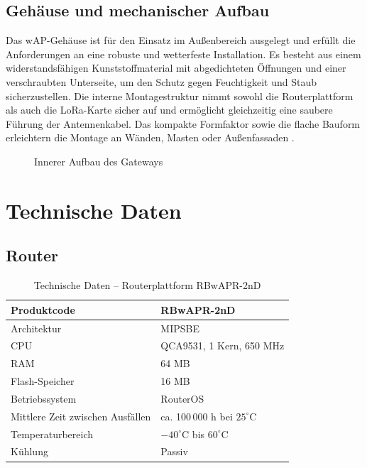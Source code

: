 	\subsection{Gehäuse und mechanischer Aufbau}
		Das wAP-Gehäuse ist für den Einsatz im Au{\ss}enbereich ausgelegt und erfüllt die Anforderungen an eine robuste und wetterfeste Installation. Es besteht aus einem widerstandsfähigen Kunststoffmaterial mit abgedichteten Öffnungen und einer verschraubten Unterseite, um den Schutz gegen Feuchtigkeit und Staub sicherzustellen. Die interne Montagestruktur nimmt sowohl die Routerplattform als auch die LoRa-Karte sicher auf und ermöglicht gleichzeitig eine saubere Führung der Antennenkabel. Das kompakte Formfaktor sowie die flache Bauform erleichtern die Montage an Wänden, Masten oder Au{\ss}enfassaden \cite{mikrotik:2020}.
		
		\begin{figure}[H]
			\centering
			\caption{Innerer Aufbau des Gateways}
		\end{figure}


\section{Technische Daten}
	\subsection{Router}
		\begin{table}[H]
			\centering
			\begin{tabular}{| l | l |}
				\hline
				Produktcode & RBwAPR-2nD \\
				\hline
				Architektur & MIPSBE \\
				\hline
				CPU & QCA9531, 1 Kern, 650 MHz \\
				\hline
				RAM & 64 MB \\
				\hline
				Flash-Speicher & 16 MB \\
				\hline
				Betriebssystem & RouterOS\\
				\hline
				Mittlere Zeit zwischen Ausfällen & ca. 100\,000 h bei \(25^\circ\mathrm{C}\) \\
				\hline
				Temperaturbereich & \(-40^\circ\mathrm{C}\) bis \(60^\circ\mathrm{C}\) \\
				\hline
				Kühlung & Passiv \\
				\hline
			\end{tabular}
			\caption{Technische Daten – Routerplattform RBwAPR-2nD \cite{mikrotik:2020}}
		\end{table}
		
